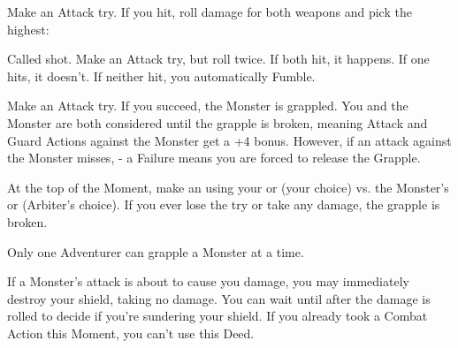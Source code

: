\begin{multicols*}{2}
  \COMBAT [
    Name = Florentine,
    Link = combat-deeds-florentine,
    Desc = Must be attacking with two Daggers\, two Shortswords\, or a mix of both
  ]

  Make an Attack try. If you hit, roll damage for both weapons and pick the highest:


  \COMBAT [
    Name = Gambit,
    Link = combat-deeds-gambit,
    Desc = Arbiter gets to add penalties to your roll depending on how crazy it is.
  ]

  Called shot. Make an Attack try, but roll twice.  If both hit, it happens.  If one hits, it doesn't.  If neither hit, you automatically Fumble.

  \COMBAT [
    Name = Grapple,
    Link = combat-deeds-grapple,
    Desc = You must be either unarmored or in Light Armor
  ]

  Make an Attack try. If you succeed, the Monster is grappled. You and the Monster are both considered  until the grapple is broken, meaning Attack and Guard Actions against the Monster get a +4 bonus. However, if an attack against the Monster misses, \RSTRY{\DEX} - a Failure means you are forced to release the Grapple. 

 At the top of the Moment, make an \RB using your \VIG or \DEX (your choice) vs. the Monster's  or  (Arbiter's choice). If you ever lose the \RB try or take any damage, the grapple is broken.

 Only one Adventurer can grapple a Monster at a time.

  \COMBAT [
    Name = Sunder Shield,
    Link = combat-deeds-sunder,
    Desc = Must have a shield equipped (it has to be on your arm / you have to be using it)
  ]

  If a Monster's attack is about to cause you  damage, you may immediately destroy your shield, taking no damage. You can wait until after the damage is rolled to decide if you're sundering your shield.  If you already took a Combat Action this Moment, you can't use this Deed.






\end{multicols*}

